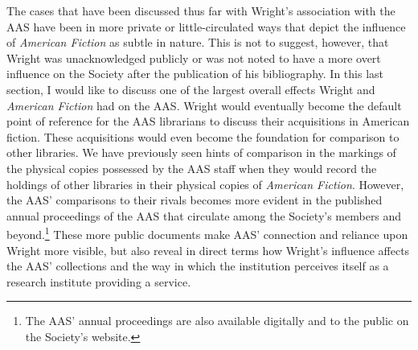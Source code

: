 The cases that have been discussed thus far with Wright's association with the AAS have been in more private or little-circulated ways that depict the influence of \textit{American Fiction} as subtle in nature. This is not to suggest, however, that Wright was unacknowledged publicly or was not noted to have a more overt influence on the Society after the publication of his bibliography. In this last section, I would like to discuss one of the largest overall effects Wright and \textit{American Fiction} had on the AAS. Wright would eventually become the default point of reference for the AAS librarians to discuss their acquisitions in American fiction. These acquisitions would even become the foundation for comparison to other libraries. We have previously seen hints of comparison in the markings of the physical copies possessed by the AAS staff when they would record the holdings of other libraries in their physical copies of \textit{American Fiction}. However, the AAS' comparisons to their rivals becomes more evident in the published annual proceedings of the AAS that circulate among the Society's members and beyond.\footnote{The AAS' annual proceedings are also available digitally and to the public on the Society's website.} These more public documents make AAS' connection and reliance upon Wright more visible, but also reveal in direct terms how Wright's influence affects the AAS' collections and the way in which the institution perceives itself as a research institute providing a service.

